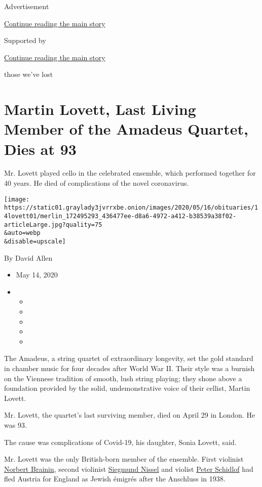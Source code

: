 Advertisement

\protect\hyperlink{after-top}{Continue reading the main story}

Supported by

\protect\hyperlink{after-sponsor}{Continue reading the main story}

those we've lost

\hypertarget{martin-lovett-last-living-member-of-the-amadeus-quartet-dies-at-93}{%
\section{Martin Lovett, Last Living Member of the Amadeus Quartet, Dies
at
93}\label{martin-lovett-last-living-member-of-the-amadeus-quartet-dies-at-93}}

Mr. Lovett played cello in the celebrated ensemble, which performed
together for 40 years. He died of complications of the novel
coronavirus.

\texttt{[image: https://static01.graylady3jvrrxbe.onion/images/2020/05/16/obituaries/14lovett01/merlin\_172495293\_436477ee-d8a6-4972-a412-b38539a38f02-articleLarge.jpg?quality=75\\\&auto=webp\\\&disable=upscale]}

By David Allen

\begin{itemize}
\item
  May 14, 2020
\item
  \begin{itemize}
  \item
  \item
  \item
  \item
  \item
  \end{itemize}
\end{itemize}

The Amadeus, a string quartet of extraordinary longevity, set the gold
standard in chamber music for four decades after World War II. Their
style was a burnish on the Viennese tradition of smooth, lush string
playing; they shone above a foundation provided by the solid,
undemonstrative voice of their cellist, Martin Lovett.

Mr. Lovett, the quartet's last surviving member, died on April 29 in
London. He was 93.

The cause was complications of Covid-19, his daughter, Sonia Lovett,
said.

Mr. Lovett was the only British-born member of the ensemble. First
violinist
\href{https://www.nytimes3xbfgragh.onion/2005/04/16/arts/music/norbert-brainin-violinist-with-the-amadeus-quartet-dies-at-82.html}{Norbert
Brainin}, second violinist
\href{https://www.nytimes3xbfgragh.onion/2008/05/24/arts/music/24nissel.html}{Siegmund
Nissel} and violist
\href{https://timesmachine.nytimes3xbfgragh.onion/timesmachine/1987/08/17/397487.html?pageNumber=24}{Peter
Schidlof} had fled Austria for England as Jewish émigrés after the
Anschluss in 1938.

